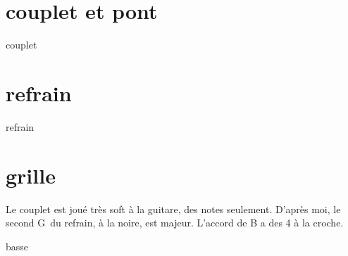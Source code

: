 \documentclass[11pt]{article}
\begin{document}
    \begin{center}
    \end{center}

%    
%
%
\begin{multicols}{2}
    \section*{couplet et pont}
    {couplet}

    \section*{refrain}
    {refrain}
    \end{multicols}

%
%


    \section*{grille}

    Le couplet est joué tr\`es soft à la guitare, des notes seulement.
    D'apr\`es moi, le second G\sharp~du refrain, \`a la noire, est majeur. L'accord de B a des 4 \`a la croche.



    



    {basse}
\end{document}
